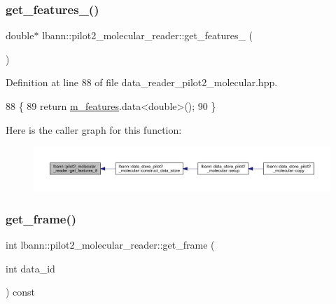 \subsubsection{\texorpdfstring{get\+\_\+features\+\_()}{get\_features\_8()}}
{\footnotesize\ttfamily double$\ast$ lbann\+::pilot2\+\_\+molecular\+\_\+reader\+::get\+\_\+features\+\_ (\begin{DoxyParamCaption}{ }\end{DoxyParamCaption})\hspace{0.3cm}{\ttfamily [inline]}}



Definition at line 88 of file data\+\_\+reader\+\_\+pilot2\+\_\+molecular.\+hpp.


\begin{DoxyCode}
88                             \{
89     \textcolor{keywordflow}{return} \hyperlink{classlbann_1_1pilot2__molecular__reader_a6b273890ecd01754e21be87da68b57bc}{m\_features}.data<\textcolor{keywordtype}{double}>();
90   \}
\end{DoxyCode}
Here is the caller graph for this function\+:\nopagebreak
\begin{figure}[H]
\begin{center}
\leavevmode
\includegraphics[width=350pt]{classlbann_1_1pilot2__molecular__reader_a6694fec3678fd8a883d5d8de6c2c74d5_icgraph}
\end{center}
\end{figure}
\mbox{\label{classlbann_1_1pilot2__molecular__reader_ac95223a0829a83a5d400c4d66efdcb93}} 
\subsubsection{\texorpdfstring{get\+\_\+frame()}{get\_frame()}}
{\footnotesize\ttfamily int lbann\+::pilot2\+\_\+molecular\+\_\+reader\+::get\+\_\+frame (\begin{DoxyParamCaption}\item[{int}]{data\+\_\+id }\end{DoxyParamCaption}) const\hspace{0.3cm}{\ttfamily [inline]}}

